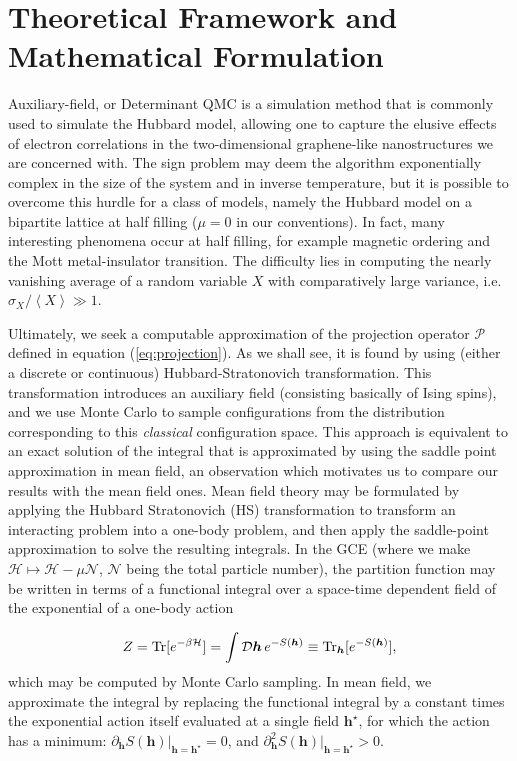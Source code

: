\section{Theoretical Framework and Mathematical Formulation}
\label{sec:matform}

Auxiliary-field, or Determinant \acs{QMC} is a simulation method that is commonly used to simulate the Hubbard model, allowing one to capture the elusive effects of electron correlations in the two-dimensional graphene-like nanostructures we are concerned with.
The sign problem may deem the algorithm exponentially complex in the size of the system and in inverse temperature, but it is possible to overcome this hurdle for a class of models, namely the Hubbard model on a bipartite lattice at half filling ($\mu = 0$ in our conventions).
In fact, many interesting phenomena occur at half filling, for example magnetic ordering and the Mott metal-insulator transition.
The difficulty lies in computing the nearly vanishing average of a random variable $X$ with comparatively large variance, i.e. $\sigma_X / \left\langle X \right\rangle \gg 1$.

Ultimately, we seek a computable approximation of the projection operator $\mathcal{P}$ defined in equation (\ref{eq:projection}).
As we shall see, it is found by using (either a discrete or continuous) Hubbard-Stratonovich transformation.
This transformation introduces an auxiliary field (consisting basically of Ising spins), and we use Monte Carlo to sample configurations from the distribution corresponding to this \emph{classical} configuration space.
This approach is equivalent to an exact solution of the integral that is approximated by using the saddle point approximation in mean field, an observation which motivates us to compare our results with the mean field ones.
Mean field theory may be formulated by applying the Hubbard Stratonovich (HS)  transformation to transform an interacting problem into a one-body problem, and then apply the saddle-point approximation to solve the resulting integrals.
In the \acs{GCE} (where we make $\mathcal{H} \mapsto \mathcal{H} - \mu \mathcal{N}$, $\mathcal{N}$ being the total particle number), the partition function may be written in terms of a functional integral over a space-time dependent field of the exponential of a one-body action

\begin{equation}
Z = \operatorname{Tr} [ e^{-\beta \mathcal{H} } ] = \int \mathcal{D}\bm h \, e^{-S(\bm h) }  \equiv \operatorname{Tr}_{\bm h} [ e^{-S(\bm h)} ],
\end{equation}
which may be computed by Monte Carlo sampling.
In mean field, we approximate the integral by replacing the functional integral by a constant times the exponential action itself evaluated at a single field $\bm h^\star$, for which the action has a minimum: $\partial_{\bm h} S( \bm h ) |_{\bm h = \bm h^\star} = 0$, and $\partial_{\bm h}^2 S( \bm h ) |_{\bm h = \bm h^\star} > 0$.

